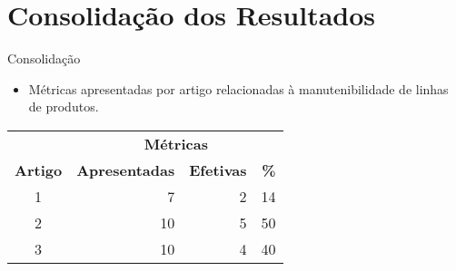 \section{Consolidação dos Resultados}
\begin{frame}{Consolidação}
    \begin{itemize}
      \item Métricas apresentadas por artigo relacionadas à manutenibilidade de linhas de produtos.
    \end{itemize}
    \begin{table}\centering
      \small
      \begin{tabular}{@{} c r r r @{}}
      \toprule
      & \multicolumn{3}{c}{\textbf{Métricas}} \\
	  \textbf{Artigo} & \textbf{Apresentadas} & \textbf{Efetivas} & \textbf{\%}\\
	  \midrule
	   1 & 7 & 2 & 14\\
	  \midrule
	   2 & 10 & 5 & 50\\
	  \midrule
       3 & 10 & 4 & 40\\
	  \bottomrule
      \end{tabular}
   \end{table}  

%    
%	  
%      
    

\end{frame}
